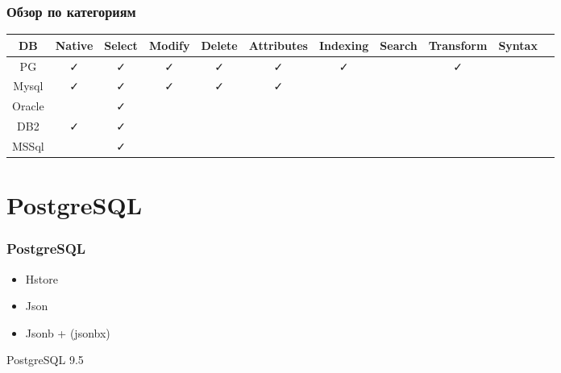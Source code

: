 \documentclass[14pt, compress, aspectratio=169]{beamer}
\def\check{\textcolor{check}{\FA \faCheck}}
\def\fail{\textcolor{fail}{\FA \faRemove}}
\def\question{\textcolor{question}{\FA \faSearch}}
\begin{document}
\begin{frame}[fragile]
    \frametitle{Обзор по категориям}

    \begin{adjustbox}{max totalsize={1.1\textwidth}{2.0\textheight},center}
        \begin{tabular}{c | c | c | c | c | c | c | c | c | c | c}
            DB & Native & Select & Modify & Delete & Attributes & Indexing & Search & Transform & Syntax \\
            \hline
            PG & \check & \check & \check & \check & \check & \check & \question & \check & \question \\
            Mysql & \check & \check & \check & \check & \check & \question & \question & \fail & \question \\
            Oracle & \fail & \check & \fail & \fail & \fail & \fail & \question & \question & \question \\
            DB2 & \check & \check & \fail & \fail & \fail & \fail & \fail & \question & \fail \\
            MSSql & \fail & \check & \fail & \fail & \fail & \fail & \question & \question & \fail \\
        \end{tabular}
    \end{adjustbox}
\end{frame}

\section{PostgreSQL}

\begin{frame}[fragile]
    \frametitle{PostgreSQL}
    \begin{itemize}[label={\MVRightarrow}]
        \item Hstore
        \item Json
        \item \alert{Jsonb + (jsonbx)}
    \end{itemize}

    PostgreSQL 9.5
\end{frame}
    
\end{document}
